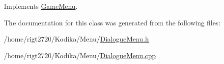 Implements \hyperlink{classGameMenu_ac32ff465c5a4f30979e8851fa21cb230}{Game\-Menu}.



The documentation for this class was generated from the following files\-:\begin{DoxyCompactItemize}
\item 
/home/rigt2720/\-Kodika/\-Menu/\hyperlink{DialogueMenu_8h}{Dialogue\-Menu.\-h}\item 
/home/rigt2720/\-Kodika/\-Menu/\hyperlink{DialogueMenu_8cpp}{Dialogue\-Menu.\-cpp}\end{DoxyCompactItemize}
